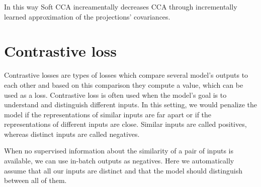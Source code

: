 In this way Soft CCA increamentally decreases CCA through incrementally learned
approximation of the projections' covariances.

\section{Contrastive loss}

Contrastive losses are types of losses which compare several model's outputs to
each other and based on this comparison they compute a value, which can be used
as a loss. Contrastive loss is often used when the model's goal is to
understand and distinguish different inputs. In this setting, we would penalize
the model if the representations of similar inputs are far apart or if the
representations of different inputs are close. Similar inputs are called
positives, whereas distinct inputs are called negatives.

When no supervised information about the similarity of a pair of inputs is
available, we can use in-batch outputs as negatives. Here we automatically
assume that all our inputs are distinct and that the model should distinguish
between all of them.
